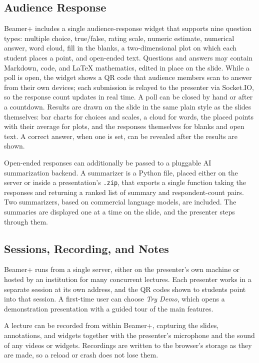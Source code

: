 \documentclass[sigconf]{acmart}
\begin{document}
\subsection{Audience Response}
\label{sec:audience}
Beamer+ includes a single audience-response widget that supports nine question types: multiple choice, true/false, rating scale, numeric estimate, numerical answer, word cloud, fill in the blanks, a two-dimensional plot on which each student places a point, and open-ended text. Questions and answers may contain Markdown, code, and \LaTeX{} mathematics, edited in place on the slide. While a poll is open, the widget shows a QR code that audience members scan to answer from their own devices; each submission is relayed to the presenter via Socket.IO, so the response count updates in real time. A poll can be closed by hand or after a countdown. Results are drawn on the slide in the same plain style as the slides themselves: bar charts for choices and scales, a cloud for words, the placed points with their average for plots, and the responses themselves for blanks and open text. A correct answer, when one is set, can be revealed after the results are shown.

Open-ended responses can additionally be passed to a pluggable AI summarization backend. A summarizer is a Python file, placed either on the server or inside a presentation's \texttt{.zip}, that exports a single function taking the responses and returning a ranked list of summary and respondent-count pairs. Two summarizers, based on commercial language models, are included. The summaries are displayed one at a time on the slide, and the presenter steps through them.

\subsection{Sessions, Recording, and Notes}
\label{sec:sessions}
Beamer+ runs from a single server, either on the presenter's own machine or hosted by an institution for many concurrent lectures. Each presenter works in a separate session at its own address, and the QR codes shown to students point into that session. A first-time user can choose \emph{Try Demo}, which opens a demonstration presentation with a guided tour of the main features.

A lecture can be recorded from within Beamer+, capturing the slides, annotations, and widgets together with the presenter's microphone and the sound of any videos or widgets. Recordings are written to the browser's storage as they are made, so a reload or crash does not lose them.
\end{document}
